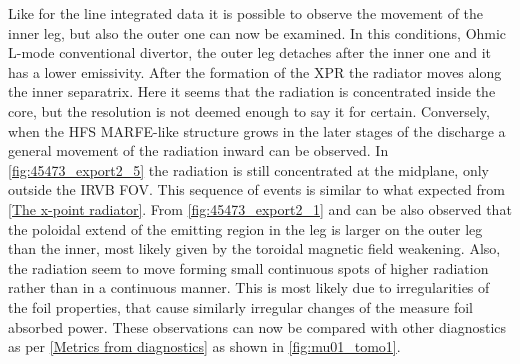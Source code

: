 Like for the line integrated data it is possible to observe the movement of the inner leg, but also the outer one can now be examined. In this conditions, Ohmic L-mode conventional divertor, the outer leg detaches after the inner one and it has a lower emissivity. After the formation of the XPR the radiator moves along the inner separatrix. Here it seems that the radiation is concentrated inside the core, but the resolution is not deemed enough to say it for certain. Conversely, when the HFS MARFE-like structure grows in the later stages of the discharge a general movement of the radiation inward can be observed. In \autoref{fig:45473_export2_5} the radiation is still concentrated at the midplane, only outside the IRVB FOV. This sequence of events is similar to what expected from \autoref{The x-point radiator}. From \autoref{fig:45473_export2_1} and  can be also observed that the poloidal extend of the emitting region in the leg is larger on the outer leg than the inner, most likely given by the toroidal magnetic field weakening. Also, the radiation seem to move forming small continuous spots of higher radiation rather than in a continuous manner. This is most likely due to irregularities of the foil properties, that cause similarly irregular changes of the measure foil absorbed power.
These observations can now be compared with other diagnostics as per \autoref{Metrics from diagnostics} as shown in \autoref{fig:mu01_tomo1}.

